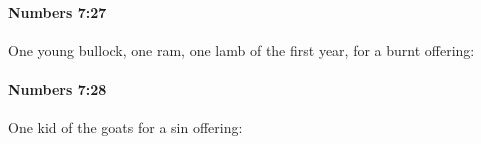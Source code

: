 		\paragraph{Numbers 7:27} %
			\label{NUMBERS-7-27}

			One young bullock, one ram, one lamb of the first year, for a burnt offering:


		\paragraph{Numbers 7:28} %
			\label{NUMBERS-7-28}

			One kid of the goats for a sin offering:


